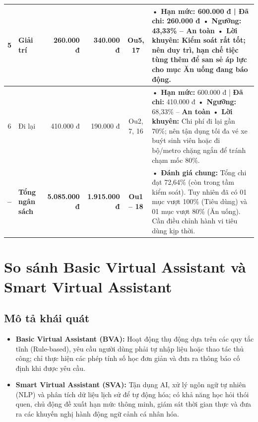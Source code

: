 \documentclass[11pt, a4paper]{article}
\begin{document}
\begin{table}[htbp]
\begin{tabularx}{\textwidth}{c p{2cm} r r c X}
5 & Giải trí & 260.000 đ & 340.000 đ & Ou5, 17 & 
\textbf{• Hạn mức:} 600.000 đ | \textbf{Đã chi:} 260.000 đ\newline
\textbf{• Ngưỡng:} 43,33\% -- \textbf{An toàn}\newline
\textbf{• Lời khuyên:} Kiểm soát rất tốt; nên duy trì, hạn chế tiệc tùng thêm để san sẻ áp lực cho mục Ăn uống đang báo động. \\
\hline

6 & Đi lại & 410.000 đ & 190.000 đ & Ou2, 7, 16 & 
\textbf{• Hạn mức:} 600.000 đ | \textbf{Đã chi:} 410.000 đ\newline
\textbf{• Ngưỡng:} 68,33\% -- \textbf{An toàn}\newline
\textbf{• Lời khuyên:} Chi phí đi lại gần 70\%; nên tận dụng tối đa vé xe buýt sinh viên hoặc đi bộ/metro chặng ngắn để tránh chạm mốc 80\%. \\
\midrule
\rowcolor{lightbg}
\textbf{--} & \textbf{Tổng ngân sách} & \textbf{5.085.000 đ} & \textbf{1.915.000 đ} & \textbf{Ou1 -- 18} & 
\textbf{• Đánh giá chung:} Tổng chi đạt 72,64\% (còn trong tầm kiểm soát). Tuy nhiên đã có 01 mục vượt 100\% (Tiêu dùng) và 01 mục vượt 80\% (Ăn uống). Cần điều chỉnh hành vi tiêu dùng kịp thời. \\
\bottomrule
\end{tabularx}
\end{table}

\newpage
\section{So sánh Basic Virtual Assistant và Smart Virtual Assistant}

\subsection*{Mô tả khái quát}
\begin{itemize}
    \item \textbf{Basic Virtual Assistant (BVA):} Hoạt động thụ động dựa trên các quy tắc tĩnh (Rule-based), yêu cầu người dùng phải tự nhập liệu hoặc thao tác thủ công; chỉ thực hiện các phép tính số học đơn giản và đưa ra thông báo cố định khi được yêu cầu.
    \item \textbf{Smart Virtual Assistant (SVA):} Tận dụng AI, xử lý ngôn ngữ tự nhiên (NLP) và phân tích dữ liệu lịch sử để tự động hóa; có khả năng học hỏi thói quen, chủ động đề xuất hạn mức thông minh, giám sát thời gian thực và đưa ra các khuyến nghị hành động ngữ cảnh cá nhân hóa.
\end{itemize}
\end{document}
